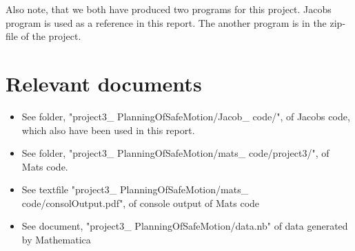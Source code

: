 Also note, that we both have produced two programs for this project. Jacobs program is used as a reference in this report. The another program is in the zip-file of the project.

\section{Relevant documents}
\begin{itemize}
\item See folder, "project3\_ PlanningOfSafeMotion/Jacob\_ code/", of Jacobs code, which also have been used in this report.
\item See folder, "project3\_ PlanningOfSafeMotion/mats\_ code/project3/",  of Mats code.
\item See textfile "project3\_ PlanningOfSafeMotion/mats\_ code/consolOutput.pdf", of console output of Mats code 
\item See document, "project3\_ PlanningOfSafeMotion/data.nb" of data generated by Mathematica
\end{itemize}